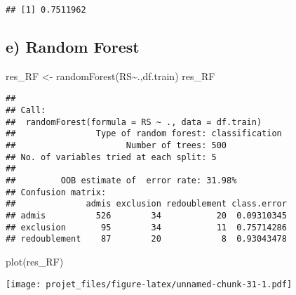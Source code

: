 \documentclass[
]{article}
\newenvironment{Shaded}{\begin{snugshade}}{\end{snugshade}}
\newcommand{\AttributeTok}[1]{\textcolor[rgb]{0.77,0.63,0.00}{#1}}
\newcommand{\DocumentationTok}[1]{\textcolor[rgb]{0.56,0.35,0.01}{\textbf{\textit{#1}}}}
\newcommand{\FunctionTok}[1]{\textcolor[rgb]{0.00,0.00,0.00}{#1}}
\newcommand{\NormalTok}[1]{#1}
\newcommand{\OtherTok}[1]{\textcolor[rgb]{0.56,0.35,0.01}{#1}}
\newcommand{\SpecialCharTok}[1]{\textcolor[rgb]{0.00,0.00,0.00}{#1}}
\newcommand{\StringTok}[1]{\textcolor[rgb]{0.31,0.60,0.02}{#1}}
\begin{document}
\begin{verbatim}
## [1] 0.7511962
\end{verbatim}

\hypertarget{e-random-forest}{%
\subsection{e) Random Forest}\label{e-random-forest}}

\begin{Shaded}
\begin{Highlighting}[]
\NormalTok{res\_RF }\OtherTok{\textless{}{-}} \FunctionTok{randomForest}\NormalTok{(RS}\SpecialCharTok{\textasciitilde{}}\NormalTok{.,df.train)}
\NormalTok{res\_RF}
\end{Highlighting}
\end{Shaded}

\begin{verbatim}
## 
## Call:
##  randomForest(formula = RS ~ ., data = df.train) 
##                Type of random forest: classification
##                      Number of trees: 500
## No. of variables tried at each split: 5
## 
##         OOB estimate of  error rate: 31.98%
## Confusion matrix:
##              admis exclusion redoublement class.error
## admis          526        34           20  0.09310345
## exclusion       95        34           11  0.75714286
## redoublement    87        20            8  0.93043478
\end{verbatim}

\begin{Shaded}
\begin{Highlighting}[]
\FunctionTok{plot}\NormalTok{(res\_RF)}
\end{Highlighting}
\end{Shaded}

\texttt{[image: projet\_files/figure-latex/unnamed-chunk-31-1.pdf]}

\begin{Shaded}
\end{Shaded}
\end{document}
